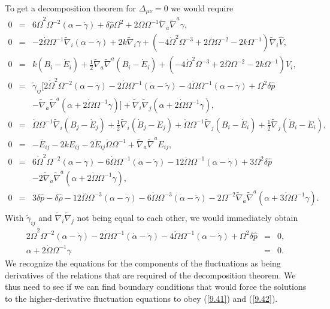 To get a decomposition theorem for $\Delta_{\mu\nu}=0$ we would require 
%
\begin{eqnarray}
0&=&6 \dot{\Omega}^2 \Omega^{-2}(\alpha-\dot\gamma) + \delta \hat{\rho}{} \Omega^2 + 2 \dot{\Omega} \Omega^{-1} \tilde{\nabla}_{a}\tilde{\nabla}^{a}\gamma, 
\nonumber\\
0&=&-2 \dot{\Omega} \Omega^{-1} \tilde{\nabla}_{i}(\alpha - \dot\gamma) + 2 k \tilde{\nabla}_{i}\gamma 
+(-4 \dot{\Omega}^2 \Omega^{-3}  + 2 \overset{..}{\Omega} \Omega^{-2}  - 2 k \Omega^{-1}) \tilde{\nabla}_{i}\hat{V},
\nonumber\\
0&=&k(B_i-\dot E_i)+ \tfrac{1}{2} \tilde{\nabla}_{a}\tilde{\nabla}^{a}(B_{i} - \dot{E}_{i})
+ (-4 \dot{\Omega}^2 \Omega^{-3} + 2 \overset{..}{\Omega} \Omega^{-2} - 2 k \Omega^{-1})V_{i},
\nonumber\\
0&=&\tilde{\gamma}_{ij}\big[ 2 \dot{\Omega}^2 \Omega^{-2}(\alpha-\dot\gamma)
-2  \dot{\Omega} \Omega^{-1}(\dot\alpha -\ddot\gamma)-4\ddot\Omega\Omega^{-1}(\alpha-\dot\gamma)+ \Omega^2 \delta \hat{p}
\nonumber\\
&&-\tilde\nabla_a\tilde\nabla^a( \alpha + 2\dot\Omega \Omega^{-1}\gamma) \big] 
+\tilde\nabla_i\tilde\nabla_j( \alpha + 2\dot\Omega \Omega^{-1}\gamma),
\nonumber\\
0&=&\dot{\Omega} \Omega^{-1} \tilde{\nabla}_{i}(B_{j}-\dot E_j)+\tfrac{1}{2} \tilde{\nabla}_{i}(\dot{B}_{j}-\ddot{E}_j)
+\dot{\Omega} \Omega^{-1} \tilde{\nabla}_{j}(B_{i}-\dot E_i)+\tfrac{1}{2} \tilde{\nabla}_{j}(\dot{B}_{i}-\ddot{E}_i),
\nonumber\\
0&=&- \overset{..}{E}_{ij} - 2 k E_{ij} - 2 \dot{E}_{ij} \dot{\Omega} \Omega^{-1} + \tilde{\nabla}_{a}\tilde{\nabla}^{a}E_{ij},
\nonumber\\
0&=&6 \dot{\Omega}^2 \Omega^{-2}(\alpha-\dot\gamma)
-6  \dot{\Omega} \Omega^{-1}(\dot\alpha -\ddot\gamma)-12\ddot\Omega\Omega^{-1}(\alpha-\dot\gamma)+ 3\Omega^2 \delta \hat{p}
\nonumber\\
&&-2\tilde\nabla_a\tilde\nabla^a( \alpha + 2\dot\Omega \Omega^{-1}\gamma),
\nonumber\\
0&=&3 \delta \hat{p}{} -  \delta \hat{\rho}
-12 \overset{..}{\Omega}  \Omega^{-3}(\alpha - \dot\gamma) -6 \dot{\Omega} \Omega^{-3}(\dot{\alpha} -\ddot\gamma)
-2 \Omega^{-2} \tilde{\nabla}_{a}\tilde{\nabla}^{a}(\alpha +3\dot\Omega\Omega^{-1}\gamma).
\nonumber\\
\label{9.41}
\end{eqnarray}
%
With $\tilde{\gamma}_{ij}$ and $\tilde{\nabla}_{i}\tilde{\nabla}_j$ not being equal to each other, we would immediately obtain 
%
\begin{eqnarray}
2 \dot{\Omega}^2 \Omega^{-2}(\alpha-\dot\gamma)
-2  \dot{\Omega} \Omega^{-1}(\dot\alpha -\ddot\gamma)-4\ddot\Omega\Omega^{-1}(\alpha-\dot\gamma)+ \Omega^2 \delta \hat{p}  &=&0,
\nonumber\\
\alpha + 2\dot\Omega \Omega^{-1}\gamma&=&0.
\label{9.42}
\end{eqnarray}
%
We recognize the equations for the components of the fluctuations as being derivatives of the relations that are required of the decomposition theorem. We thus need to see if we can find boundary conditions that would force the solutions to the higher-derivative fluctuation equations to obey (\ref{9.41}) and (\ref{9.42}).

